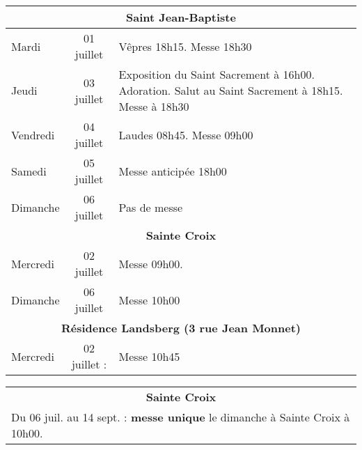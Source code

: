 \documentclass[french,11pt]{article}
\begin{document}
\begin{tabular} {lcp{9cm}}
\multicolumn{3}{c}{\textbf{Saint Jean-Baptiste} } \\ \hline
Mardi    & 01 juillet  & Vêpres 18h15. Messe 18h30 \\ \hline
Jeudi    & 03 juillet  &
Exposition du Saint Sacrement à 16h00. Adoration. Salut au Saint Sacrement à 18h15. Messe à 18h30 
 \\ \hline
Vendredi & 04 juillet  & Laudes 08h45. Messe 09h00 \\ \hline
Samedi   & 05 juillet  & Messe anticipée 18h00 \\ \hline
Dimanche & 06 juillet  & Pas de messe \\ \hline
\multicolumn{3}{c}{\textbf{Sainte Croix} } \\ \hline
Mercredi & 02 juillet  & Messe 09h00.
\\ \hline
Dimanche  & 06 juillet  & Messe 10h00\\ \hline
\multicolumn{3}{c}{\textbf{Résidence Landsberg (3 rue Jean Monnet)} } \\ \hline
Mercredi & 02 juillet : & Messe 10h45 \\ \hline
\end{tabular}

\begin{framed}
\begin{tabular} {lcp{8cm}}
\multicolumn{3}{c}{\textbf{Sainte Croix} } \\
\multicolumn{3}{l}{ Du 06 juil. au 14 sept. : \textbf{messe unique} le dimanche à Sainte Croix à 10h00.} \\
\end{tabular}
\end{framed}
\end{document}

